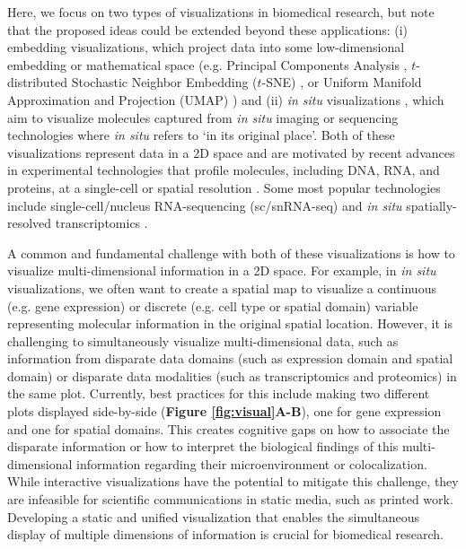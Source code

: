 \documentclass[10pt,twocolumn]{article}
\begin{document}
Here, we focus on two types of visualizations in biomedical research, but note that the proposed ideas could be extended beyond these applications: (i) embedding visualizations, which project data into some low-dimensional embedding or mathematical space (e.g. Principal Components Analysis %
\cite{hotelling_1933}, $t$-distributed Stochastic Neighbor Embedding ($t$-SNE) \cite{vandermaaten_2008}, or Uniform Manifold Approximation and Projection (UMAP) \cite{becht_2019}) and (ii) \textit{in situ} visualizations \cite{dries_2021, Lewis_2021, odonoghue_2021}, which aim to visualize molecules captured from \textit{in situ} imaging or sequencing technologies where \textit{in situ} refers to `in its original place'. Both of these visualizations represent data in a 2D space and are motivated by recent advances in experimental technologies that profile molecules, including DNA, RNA, and proteins, at a single-cell or spatial resolution \cite{kashima_2020, moffitt_2022}. Some most popular technologies include single-cell/nucleus RNA-sequencing (sc/snRNA-seq)
\cite{aldridge_2020} and \textit{in situ} spatially-resolved transcriptomics \cite{larsson_2021}. 
% 

A common and fundamental challenge with both of these visualizations is how to visualize multi-dimensional information in a 2D space. For example, in \textit{in situ} visualizations, we often want to create a spatial map to visualize a continuous (e.g. gene expression) or discrete (e.g. cell type or spatial domain) variable representing molecular information in the original spatial location. However, it is challenging to simultaneously visualize multi-dimensional data, such as information from disparate data domains (such as expression domain and spatial domain) or disparate data modalities (such as transcriptomics and proteomics) in the same plot. Currently, best practices for this include making two different plots displayed side-by-side (\textbf{Figure \textbf{\ref{fig:visual}A-B}}), one for gene expression and one for spatial domains. This creates cognitive gaps on how to associate the disparate information or how to interpret the biological findings of this multi-dimensional information regarding their microenvironment or colocalization. While interactive visualizations \cite{keller_2021, pardo_2022, sriworarat_2023} have the potential to mitigate this challenge, they are infeasible for scientific communications in static media, such as printed work. Developing a static and unified visualization that enables the simultaneous display of multiple dimensions of information is crucial for biomedical research.
\end{document}
